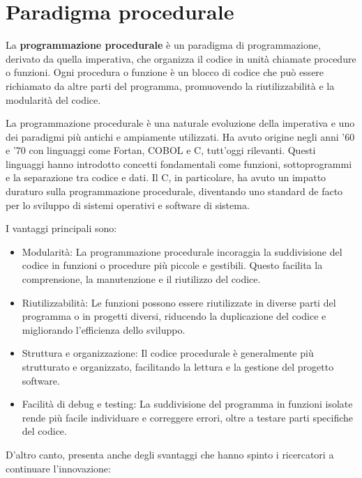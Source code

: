 \documentclass[
  letterpaper,
]{scrbook}
\providecommand{\tightlist}{%
  \setlength{\itemsep}{0pt}\setlength{\parskip}{0pt}}\usepackage{longtable,booktabs,array}
\begin{document}
\section{Paradigma procedurale}\label{paradigma-procedurale}

La \textbf{programmazione procedurale} è un paradigma di programmazione,
derivato da quella imperativa, che organizza il codice in unità chiamate
procedure o funzioni. Ogni procedura o funzione è un blocco di codice
che può essere richiamato da altre parti del programma, promuovendo la
riutilizzabilità e la modularità del codice.

La programmazione procedurale è una naturale evoluzione della imperativa
e uno dei paradigmi più antichi e ampiamente utilizzati. Ha avuto
origine negli anni '60 e '70 con linguaggi come Fortan, COBOL e C,
tutt'oggi rilevanti. Questi linguaggi hanno introdotto concetti
fondamentali come funzioni, sottoprogrammi e la separazione tra codice e
dati. Il C, in particolare, ha avuto un impatto duraturo sulla
programmazione procedurale, diventando uno standard de facto per lo
sviluppo di sistemi operativi e software di sistema.

I vantaggi principali sono:

\begin{itemize}
\tightlist
\item
  Modularità: La programmazione procedurale incoraggia la suddivisione
  del codice in funzioni o procedure più piccole e gestibili. Questo
  facilita la comprensione, la manutenzione e il riutilizzo del codice.
\item
  Riutilizzabilità: Le funzioni possono essere riutilizzate in diverse
  parti del programma o in progetti diversi, riducendo la duplicazione
  del codice e migliorando l'efficienza dello sviluppo.
\item
  Struttura e organizzazione: Il codice procedurale è generalmente più
  strutturato e organizzato, facilitando la lettura e la gestione del
  progetto software.
\item
  Facilità di debug e testing: La suddivisione del programma in funzioni
  isolate rende più facile individuare e correggere errori, oltre a
  testare parti specifiche del codice.
\end{itemize}

D'altro canto, presenta anche degli svantaggi che hanno spinto i
ricercatori a continuare l'innovazione:
\end{document}
